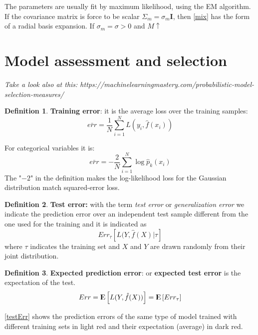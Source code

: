 \documentclass[12pt, letterpaper]{article}
\theoremstyle{definition}
\newtheorem{definition}{Definition}[section]
\newcommand{\E}{{\rm I\kern-.3em E}}
\newcommand{\I}{\mathrm{\mathbf{I}}}
\begin{document}
The parameters are usually fit by maximum likelihood, using the EM algorithm. If the covariance matrix is force to be scalar $\Sigma_m = \sigma_m \I$, then \ref{mix} has the form of a radial basis expansion. If $\sigma_m = \sigma >0$ and $M \uparrow $

\section{Model assessment and selection}
\textit{Take a look also at this: https://machinelearningmastery.com/probabilistic-model-selection-measures/}
\begin{definition}{\textbf{Training error}}: it is the average loss over the training samples:
\begin{equation}
\bar{err} = \frac{1}{N}\sum_{i=1}^N L(y_i, \hat{f}(x_i))
\end{equation}

For categorical variables it is:
\begin{equation}
\bar{err}  = -\frac{2}{N} \sum_{i=1}^N \log\hat{p}_k(x_i)
\end{equation}
The "$-2$" in the definition makes the log-likelihood loss for the Gaussian distribution match squared-error loss.
\label{trainErr}
\end{definition}

\begin{definition}{\textbf{Test error:}} with  the term \textit{test error} or \textit{generalization error} we indicate the prediction error over an independent test sample different from the one used for the training and it is indicated as 
\begin{equation}
Err_\tau \left[L(Y,\hat{f}(X)|\tau\right]
\end{equation}
where $\tau$ indicates the training set and $X$ and $Y$ are drawn randomly from their joint distribution.
\end{definition}

\begin{definition}{\textbf{Expected prediction error}}: or \textbf{expected test error} is the expectation of the test.
\begin{equation}
Err = \E\left[ L(Y,\hat{f}(X))\right] =  \E\left[Err_\tau\right]
\end{equation}
\end{definition}

\ref{testErr} shows the prediction errors of the same type of model trained with different training sets in light red and their expectation (average) in dark red.
\end{document}
